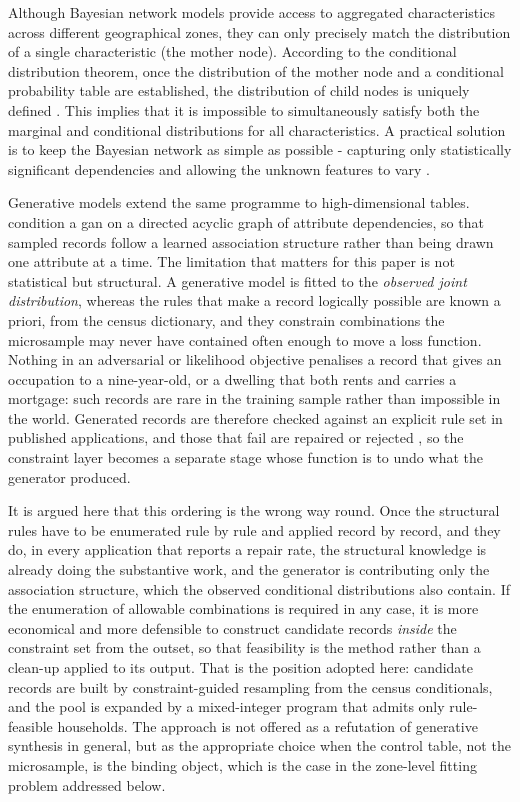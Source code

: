 ﻿\documentclass[../main.tex]{subfiles}
\begin{document}
Although Bayesian network models provide access to aggregated characteristics across different geographical zones, they can only precisely match the distribution of a single characteristic (the mother node). According to the conditional distribution theorem, once the distribution of the mother node and a conditional probability table are established, the distribution of child nodes is uniquely defined \citep{Jafari2022BuildingModels}. This implies that it is impossible to simultaneously satisfy both the marginal and conditional distributions for all characteristics. A practical solution is to keep the Bayesian network as simple as possible - capturing only statistically significant dependencies and allowing the unknown features to vary \citep{Zhang2019ConnectedSimulation,Aemmer2022GenerativeCharacteristics}.

Generative models extend the same programme to high-dimensional tables. \citet{Lederrey2022DATGAN:Data} condition a \gls{gan} on a directed acyclic graph of attribute dependencies, so that sampled records follow a learned association structure rather than being drawn one attribute at a time. The limitation that matters for this paper is not statistical but structural. A generative model is fitted to the \emph{observed joint distribution}, whereas the rules that make a record logically possible are known a priori, from the census dictionary, and they constrain combinations the microsample may never have contained often enough to move a loss function. Nothing in an adversarial or likelihood objective penalises a record that gives an occupation to a nine-year-old, or a dwelling that both rents and carries a mortgage: such records are rare in the training sample rather than impossible in the world. Generated records are therefore checked against an explicit rule set in published applications, and those that fail are repaired or rejected \citep{Kim2023ASynthesis}, so the constraint layer becomes a separate stage whose function is to undo what the generator produced.

It is argued here that this ordering is the wrong way round. Once the structural rules have to be enumerated rule by rule and applied record by record, and they do, in every application that reports a repair rate, the structural knowledge is already doing the substantive work, and the generator is contributing only the association structure, which the observed conditional distributions also contain. If the enumeration of allowable combinations is required in any case, it is more economical and more defensible to construct candidate records \emph{inside} the constraint set from the outset, so that feasibility is the method rather than a clean-up applied to its output. That is the position adopted here: candidate records are built by constraint-guided resampling from the census conditionals, and the pool is expanded by a mixed-integer program that admits only rule-feasible households. The approach is not offered as a refutation of generative synthesis in general, but as the appropriate choice when the control table, not the microsample, is the binding object, which is the case in the zone-level fitting problem addressed below.
\end{document}
